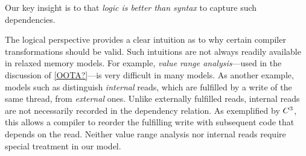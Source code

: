 Our key insight is to that \emph{logic is better than syntax} to capture such
dependencies.

The logical perspective provides a clear intuition as to why certain compiler
transformations should be valid.  Such intuitions are not always readily
available in relaxed memory models.  For example, \emph{value range
  analysis}---used in the discussion of \eqref{OOTA?}---is very difficult in
many models.  As another example, models such as \armeight{} distinguish
\emph{internal} reads, which are fulfilled by a write of the same thread,
from \emph{external} ones.  Unlike externally fulfilled reads, internal reads
are not necessarily recorded in the dependency relation.  As exemplified by
$C^3$, this allows a compiler to reorder the fulfilling write with
subsequent code that depends on the read.  Neither value range analysis nor
internal reads require special treatment in our model.













